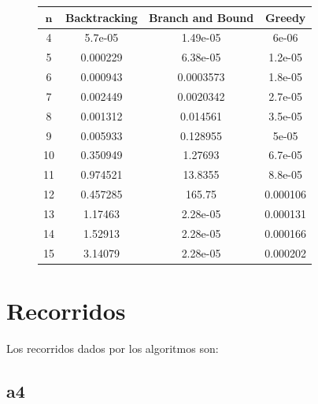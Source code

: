 \documentclass[a4]{article}
\begin{document}
\begin{figure}[H]
  \centering
  \label{tab:tiempos}
  \begin{tabular}{| c | c | c | c |}
    \hline
    \multicolumn{1}{|c|}{$\textbf{n}$}& \textbf{Backtracking}&
    \textbf{Branch and Bound}& \textbf{Greedy} \\ \hline
     4 & 5.7e-05   & 1.49e-05  & 6e-06     \\ 
     5 & 0.000229  & 6.38e-05  & 1.2e-05   \\ 
     6 & 0.000943  & 0.0003573 & 1.8e-05   \\ 
     7 & 0.002449  & 0.0020342 & 2.7e-05   \\ 
     8 & 0.001312  & 0.014561  & 3.5e-05   \\ 
     9 & 0.005933  & 0.128955  & 5e-05     \\ 
    10 & 0.350949  & 1.27693   & 6.7e-05   \\ 
    11 & 0.974521  & 13.8355   & 8.8e-05   \\ 
    12 & 0.457285  & 165.75    & 0.000106  \\
    13 & 1.17463   & 2.28e-05  & 0.000131  \\
    14 & 1.52913   & 2.28e-05  & 0.000166  \\
    15 & 3.14079   & 2.28e-05  & 0.000202  \\ \hline
  \end{tabular}
\end{figure}

\section{Recorridos}
Los recorridos dados por los algoritmos son:

\subsection{a4}
\setcounter{subfigure}{0}
\end{document}
